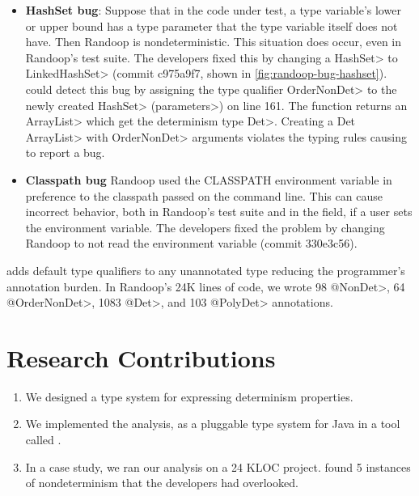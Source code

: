 \begin{itemize}
    \item
    \textbf{HashSet bug}: Suppose that in the code under test, a type variable's lower or upper
    bound has a type parameter that the type variable itself does not have. Then Randoop is nondeterministic.
    This situation does occur, even in Randoop's test suite.
    The developers fixed this by changing a \<HashSet> to \<LinkedHashSet>
    (commit c975a9f7, shown in \cref{fig:randoop-bug-hashset}). 
    \TheDeterminismChecker could detect this bug by assigning the type qualifier \<OrderNonDet>
    to the newly created \<HashSet> (\<parameters>) on line 161. The function returns an \<ArrayList> which get the determinism type \<Det>. Creating a \<Det ArrayList> with 
    \<OrderNonDet> arguments violates the typing rules causing \theDeterminismChecker to report a bug.
    
    \item
    \textbf{Classpath bug}
    Randoop used the CLASSPATH environment variable in preference to the
    classpath passed on the command line.
    This can cause incorrect behavior, both in Randoop's test suite and in the field,
    if a user sets the environment variable.
    The developers fixed the problem by changing Randoop to not read the environment variable
    (commit 330e3c56).
\end{itemize}

\TheDeterminismChecker adds default type qualifiers to any unannotated type reducing the programmer's annotation burden.
In Randoop's 24K lines of code, we wrote
98 \<@NonDet>,
64 \<@OrderNonDet>,
1083 \<@Det>,
and 103 \<@PolyDet> annotations.

\section{Research Contributions\label{sec:contributions}}
\begin{enumerate}
  \item We designed a type system for expressing determinism properties.

  \item We implemented the analysis, as a pluggable type system for Java in a
    tool called \theDeterminismChecker.

  \item In a case study, we ran our analysis on a 24 KLOC project.
    \TheDeterminismChecker
    found 5 instances of nondeterminism that the developers had
    overlooked.
\end{enumerate}

